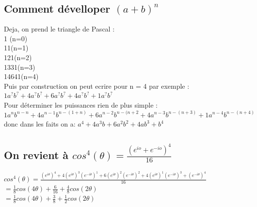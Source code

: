 \documentclass[10pt,a4paper]{article}
\begin{document}
 \subsection{Comment dévelloper $(a+b)^n$}
 Deja, on prend le triangle de Pascal :\\
 1 (n=0)\\
 11(n=1)\\
 121(n=2)\\
 1331(n=3)\\
 14641(n=4)\\
 Puis par construction on peut ecrire pour n = 4 par exemple : $1a^?b^? + 4a^?b^? + 6a^?b^?+4a^?b^?+1a^?b^?$\\
 Pour déterminer les puissances rien de plus simple :  $1a^{n}b^{n-n} + 4a^{n-1}b^{n-(1+n)} + 6a^{n-2}b^{n-(n+2}+4a^{n-3}b^{n-(n+3)}+1a^{n-4}b^{n-(n+4)}$\\
 donc dans les faits on a: $a^4+4a^3b+6a^2b^2+4ab^3+b^4$
 \newpage
 \subsection{On revient à $cos^4(\theta)=\frac{(e^{io}+e^{-io})^4}{16}$}
$cos^4(\theta)=\frac{(e^{i\theta})^4+4(e^{i\theta})^3(e^{-i\theta})^1+6(e^{i\theta})^2(e^{-i\theta})^2+4(e^{i\theta})^1(e^{-i\theta})^3+(e^{-i\theta})^4}{16}$\\

 $=\frac{1}{8}cos(4\theta)+\frac{6}{16}+\frac{4}{8}cos(2\theta)$\\
 
 $=\frac{1}{8}cos(4\theta)+\frac{3}{8}+\frac{1}{2}cos(2\theta)$
 
 
\end{document}
